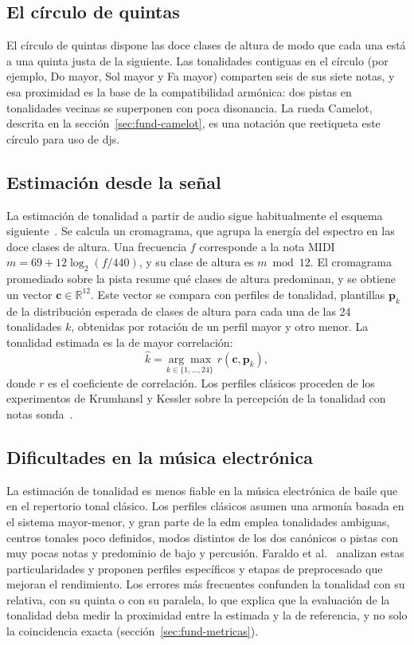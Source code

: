 \subsection{El círculo de quintas}

El círculo de quintas dispone las doce clases de altura de modo que cada una está a una quinta justa de la siguiente. Las tonalidades contiguas en el círculo (por ejemplo, Do mayor, Sol mayor y Fa mayor) comparten seis de sus siete notas, y esa proximidad es la base de la compatibilidad armónica: dos pistas en tonalidades vecinas se superponen con poca disonancia. La rueda Camelot, descrita en la sección~\ref{sec:fund-camelot}, es una notación que reetiqueta este círculo para uso de \acsp{dj}.

\subsection{Estimación desde la señal}

La estimación de tonalidad a partir de audio sigue habitualmente el esquema siguiente~\cite{gomez2006tonal}. Se calcula un cromagrama, que agrupa la energía del espectro en las doce clases de altura. Una frecuencia $f$ corresponde a la nota MIDI $m = 69 + 12 \log_2 (f/440)$, y su clase de altura es $m \bmod 12$. El cromagrama promediado sobre la pista resume qué clases de altura predominan, y se obtiene un vector $\mathbf{c} \in \mathbb{R}^{12}$. Este vector se compara con perfiles de tonalidad, plantillas $\mathbf{p}_k$ de la distribución esperada de clases de altura para cada una de las 24 tonalidades $k$, obtenidas por rotación de un perfil mayor y otro menor. La tonalidad estimada es la de mayor correlación:
\begin{equation}
  \hat{k} = \underset{k \in \{1,\dots,24\}}{\arg\max}\; r\!\left(\mathbf{c}, \mathbf{p}_k\right),
  \label{eq:key}
\end{equation}
donde $r$ es el coeficiente de correlación. Los perfiles clásicos proceden de los experimentos de Krumhansl y Kessler sobre la percepción de la tonalidad con notas sonda~\cite{krumhansl1982tracing}.

\subsection{Dificultades en la música electrónica}

La estimación de tonalidad es menos fiable en la música electrónica de baile que en el repertorio tonal clásico. Los perfiles clásicos asumen una armonía basada en el sistema mayor-menor, y gran parte de la \acs{edm} emplea tonalidades ambiguas, centros tonales poco definidos, modos distintos de los dos canónicos o pistas con muy pocas notas y predominio de bajo y percusión. Faraldo et al.~\cite{faraldo2016key} analizan estas particularidades y proponen perfiles específicos y etapas de preprocesado que mejoran el rendimiento. Los errores más frecuentes confunden la tonalidad con su relativa, con su quinta o con su paralela, lo que explica que la evaluación de la tonalidad deba medir la proximidad entre la estimada y la de referencia, y no solo la coincidencia exacta (sección~\ref{sec:fund-metricas}).

